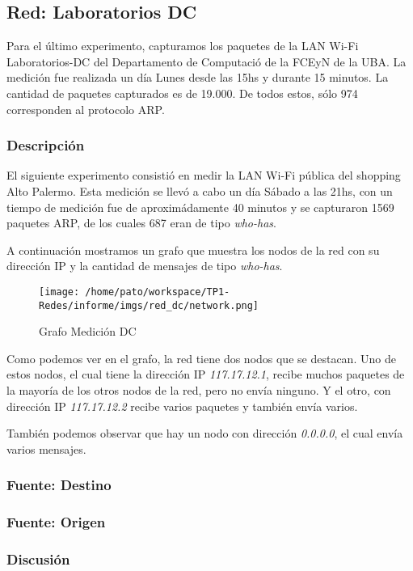 \subsection{Red: Laboratorios DC}

Para el último experimento, capturamos los paquetes de la LAN Wi-Fi Laboratorios-DC del Departamento de Computació de la FCEyN de la UBA. La medición fue realizada un día Lunes desde las 15hs y durante 15 minutos. La cantidad de paquetes capturados es de 19.000. De todos estos, sólo 974 corresponden al protocolo ARP.

\subsubsection{Descripción}

El siguiente experimento consistió en medir la LAN Wi-Fi pública del shopping Alto Palermo. Esta medición se llevó a cabo un día Sábado a las 21hs, con un tiempo de medición fue de aproximádamente 40 minutos y se capturaron 1569 paquetes ARP, de los cuales 687 eran de tipo \emph{who-has}.

A continuación mostramos un grafo que muestra los nodos de la red con su dirección IP y la cantidad de mensajes de tipo \emph{who-has}.

\begin{figure}[H]
 \begin{center}
  \texttt{[image: /home/pato/workspace/TP1-Redes/informe/imgs/red\_dc/network.png]}
  \caption{Grafo Medición DC}
 \end{center}
\end{figure}

Como podemos ver en el grafo, la red tiene dos nodos que se destacan. Uno de estos nodos, el cual tiene la dirección IP \emph{117.17.12.1}, recibe muchos paquetes de la mayoría de los otros nodos de la red, pero no envía ninguno. Y el otro, con dirección IP \emph{117.17.12.2} recibe varios paquetes y también envía varios.

También podemos observar que hay un nodo con dirección \emph{0.0.0.0}, el cual envía varios mensajes. %

\subsubsection{Fuente: Destino}


\subsubsection{Fuente: Origen}



\subsubsection{Discusión}